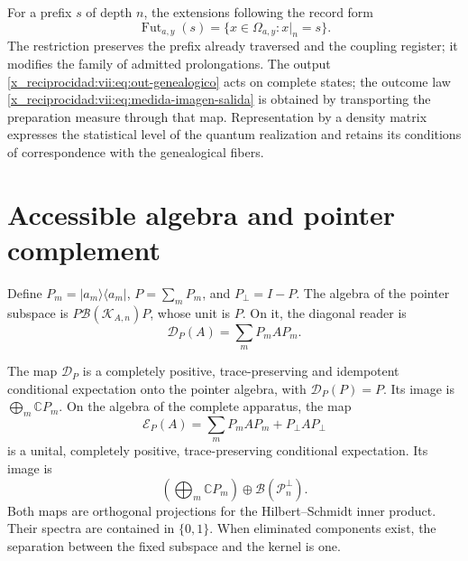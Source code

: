 For a prefix \(s\) of depth \(n\), the extensions following the record
form
\[
 \operatorname{Fut}_{a,y}(s)
 =\{x\in\Omega_{a,y}:x|_n=s\}.
\]
The restriction preserves the prefix already traversed and the coupling
register; it modifies the family of admitted prolongations. The output
\eqref{x_reciprocidad:vii:eq:out-genealogico} acts on complete states; the outcome law
\eqref{x_reciprocidad:vii:eq:medida-imagen-salida} is obtained by transporting
the preparation measure through that map. Representation by a
density matrix expresses the statistical
level of the quantum realization and retains its conditions of
correspondence with the genealogical fibers.



\section{Accessible algebra and pointer complement}
\label{x_reciprocidad:vii:sec:observador-expectativa}

Define \(P_m=|a_m\rangle\langle a_m|\),
\(P=\sum_mP_m\), and \(P_\perp=I-P\). The algebra of the pointer
subspace is \(P\mathcal B(\mathcal K_{A,n})P\), whose unit is \(P\).
On it, the diagonal reader is
\[
 \mathcal D_P(A)=\sum_mP_mAP_m.
\]

\begin{proposition}
\label{x_reciprocidad:vii:prop:observador-pinzamiento}
The map \(\mathcal D_P\) is a completely positive,
trace-preserving and idempotent conditional expectation onto the
pointer algebra, with \(\mathcal D_P(P)=P\). Its image is
\(\bigoplus_m\mathbb CP_m\).
On the algebra of the complete apparatus, the map
\begin{equation}
 \mathcal E_P(A)=\sum_mP_mAP_m+P_\perp AP_\perp
 \label{x_reciprocidad:vii:eq:observador-complemento}
\end{equation}
is a unital, completely positive, trace-preserving
conditional expectation. Its image is
\[
 \left(\bigoplus_m\mathbb CP_m\right)
 \oplus\mathcal B(\mathcal P_n^\perp).
\]
Both maps are orthogonal projections for the Hilbert--Schmidt
inner product. Their spectra are contained in \(\{0,1\}\).
When eliminated components exist, the separation between the
fixed subspace and the kernel is one.
\end{proposition}

